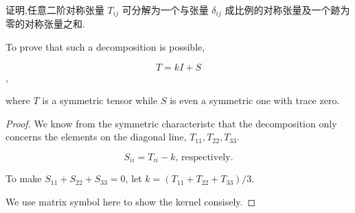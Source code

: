 \begin{exercise}
    证明,任意二阶对称张量 $T_{ij}$ 可分解为一个与张量 $\delta_{ij}$ 成比例的对称张量及一个跡为零的对称张量之和.

    
    To prove that such a decomposition is possible, 

    $$ T = kI + S$$,
    
    where $T$ is a symmetric tensor while $S$ is even a symmetric one with trace zero.
\end{exercise}

\begin{proof}

    We know from the symmetric characteristc that the decomposition only concerns the elements on the diagonal line, $T_{11},T_{22},T_{33}$.

    $$S_{ii}=T_{ii}-k \text{, respectively.}$$

    To make $S_{11}+S_{22}+S_{33}=0$, let $k=(T_{11}+T_{22}+T_{33})/3$.

    We use matrix symbol here to show the kernel consisely.
    
\end{proof}